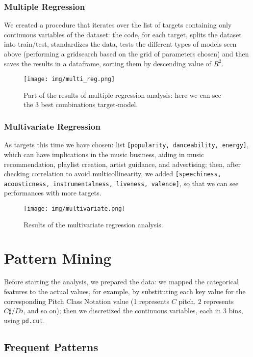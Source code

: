 \subsubsection{Multiple Regression}
We created a procedure that iterates over the list of targets containing only continuous variables of the dataset: the code, for each target, splits the dataset into train/test, standardizes the data, tests the different types of models seen above (performing a gridsearch based on the grid of parameters chosen) and then saves the results in a dataframe, sorting them by descending value of $R^2$.
\begin{figure}[H]
    \centering
    \texttt{[image: img/multi\_reg.png]}
    \caption{Part of the results of multiple regression analysis: here we can see the 3 best combinations target-model.}
    \label{fig:enter-label}
\end{figure}
\subsubsection{Multivariate Regression}
As targets this time we have chosen: list \texttt{[popularity, danceability, energy]}, which can have implications in the music business, aiding in music recommendation, playlist creation, artist guidance, and advertising; then, after checking correlation to avoid multicollinearity, we added \texttt{[speechiness, acousticness, instrumentalness, liveness, valence]}, so that we can see performances with more targets.
\begin{figure}[H]
    \centering
    \texttt{[image: img/multivariate.png]}
    \caption{Results of the multivariate regression analysis.}
    \label{fig:enter-label}
\end{figure}
\section{Pattern Mining}
Before starting the analysis, we prepared the data: we mapped the categorical features to the actual values, for example, by substituting each key value for the corresponding Pitch Class Notation value (1 represents $C$ pitch, 2 represents $C\sharp/D\flat$, and so on); then we discretized the continuous variables, each in 3 bins, using \texttt{pd.cut}.
\subsection{Frequent Patterns}
